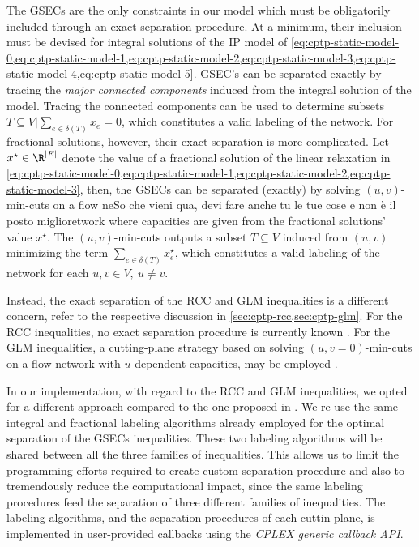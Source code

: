 The GSECs are the only constraints in our model which must be obligatorily
included through an exact separation procedure.
At a minimum, their inclusion must be devised
for integral solutions of the IP model of
\cref{eq:cptp-static-model-0,eq:cptp-static-model-1,eq:cptp-static-model-2,eq:cptp-static-model-3,eq:cptp-static-model-4,eq:cptp-static-model-5}.
GSEC's can be separated exactly
by tracing the \textit{major connected components}
induced from the integral solution of the model.
Tracing the connected components can be used to determine subsets
$T \subseteq V | \sum_{e \in \delta(T)} x_e = 0$,
which constitutes a valid labeling of the network.
For fractional solutions, however, their exact separation is more complicated.
Let $x^\star \in \R^{|E|}$ denote the value of a fractional solution of
the linear relaxation in
\cref{eq:cptp-static-model-0,eq:cptp-static-model-1,eq:cptp-static-model-2,eq:cptp-static-model-3},
then,
the GSECs can be separated (exactly) by solving $(u, v)$-min-cuts
on a flow neSo che vieni qua, devi fare anche tu le tue cose e non è il posto miglioretwork where capacities are given from the fractional solutions' value $x^\star$.
The $(u, v)$-min-cuts outputs a subset $T \subseteq V$ induced from $(u, v)$
minimizing the term $\sum_{e \in \delta(T)} x^\star_e$,
which constitutes a valid labeling of the network for each $u, v \in V,\ u \ne v$.

Instead, the exact separation of the RCC and GLM inequalities
is a different concern, refer to the respective discussion in \cref{sec:cptp-rcc,sec:cptp-glm}.
For the RCC inequalities,
no exact separation procedure is currently known \parencite{jepsen2014}.
For the GLM inequalities,
a cutting-plane strategy based on solving
$(u, v=0)$-min-cuts on a flow network with $u$-dependent capacities,
may be employed \parencite{letchford2006, jepsen2014}.

\medskip

In our implementation, with regard to the RCC and GLM inequalities,
we opted for a different approach compared to the one proposed in \textcite{jepsen2014}.
We re-use the same integral and fractional labeling algorithms
already employed for the optimal separation of the GSECs inequalities.
These two labeling algorithms will be shared between all the three families of inequalities.
This allows us to limit the programming efforts required to create custom
separation procedure
and also to tremendously reduce the computational impact,
since the same labeling procedures feed the separation of three different families of inequalities.
The labeling algorithms, and the separation procedures of each cuttin-plane,
is implemented in user-provided callbacks using the \textit{CPLEX generic callback API}.

